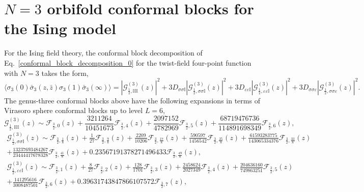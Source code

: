 \documentclass[a4paper,11pt]{article}
\begin{document}
\section{$N=3$ orbifold conformal blocks for the Ising model}\label{app_ising}

For the Ising field theory, the conformal block decomposition of 
Eq.~\eqref{conformal_block_decomposition_0} for the twist-field 
four-point function with $N=3$ takes the form,
\begin{equation}\label{orbifold_cb_ising}
 \langle \sigma_3(0)\bar{\sigma}_3(z, \bar{z})\sigma_3(1)\bar{\sigma}_3(\infty)\rangle=
 |\mathcal{G}_{\frac{1}{2},\mathbb{I}\mathbb{I}\mathbb{I}}^{(3)}(z)|^2+
 3D_{\sigma\sigma\mathbb{I}}|\mathcal{G}_{\frac{1}{2},\sigma\sigma\mathbb{I}}^{(3)}(z)|^2+
 3D_{\varepsilon\varepsilon\mathbb{I}}|\mathcal{G}_{\frac{1}{2},\varepsilon\varepsilon\mathbb{I}}^{(3)}(z)|^2+
 3D_{\sigma\sigma\varepsilon}|\mathcal{G}_{\frac{1}{2},\sigma\sigma\varepsilon}^{(3)}(z)|^2.
\end{equation}
The genus-three conformal blocks above have the following 
expansions in terms of Virasoro sphere conformal blocks up to level $L=6$,
\begin{equation}
 \mathcal{G}_{\frac{1}{2},\mathbb{I}\mathbb{I}\mathbb{I}}^{(3)}(z)\sim
 \mathcal{F}_{\frac{3}{2}, 0}(z) + 
 \frac{3211264}{10451673} \mathcal{F}_{\frac{3}{2}, 4}(z) + 
 \frac{2097152}{4782969} \mathcal{F}_{\frac{3}{2}, 5}(z) + 
 \frac{68719476736}{114891698349}\mathcal{F}_{\frac{3}{2}, 6}(z),
\end{equation}
\begin{multline}
 \mathcal{G}_{\frac{1}{2},\sigma\sigma\mathbb{I}}^{(3)}(z)\sim
 \mathcal{F}_{\frac{3}{2},\frac{1}{8}}(z) + 
 \frac{1}{27} \mathcal{F}_{\frac{3}{2}, \frac{9}{8}}(z) + 
 \frac{2209}{10206} \mathcal{F}_{\frac{3}{2}, \frac{17}{8}}(z) + 
 \frac{590597}{1456542} \mathcal{F}_{\frac{3}{2}, \frac{25}{8}}(z) + 
 \frac{61593283775}{143065334376}\mathcal{F}_{\frac{3}{2}, \frac{33}{8}}(z) \\ + 
 \frac{13237693484267}{23444417678328}\mathcal{F}_{\frac{3}{2}, \frac{41}{8}}(z) + 
 0.23567191378271496433 \mathcal{F}_{\frac{3}{2}, \frac{49}{8}}(z),
\end{multline}
\begin{multline}
 \mathcal{G}_{\frac{1}{2},\varepsilon\varepsilon\mathbb{I}}^{(3)}(z)\sim
 \mathcal{F}_{\frac{3}{2}, 1}(z)+ 
 \frac{8}{27} \mathcal{F}_{\frac{3}{2}, 2}(z)+ 
 \frac{128}{1701}\mathcal{F}_{\frac{3}{2}, 3}(z) + 
 \frac{2458624}{2027349}\mathcal{F}_{\frac{3}{2}, 4}(z) + 
 \frac{204636160}{749863251}\mathcal{F}_{\frac{3}{2}, 5}(z) \\+ 
 \frac{141295616}{3008487501}\mathcal{F}_{\frac{3}{2},6}(z) + 
 0.39631743847866107572\mathcal{F}_{\frac{3}{2}, 7}(z),
\end{multline}
\end{document}
